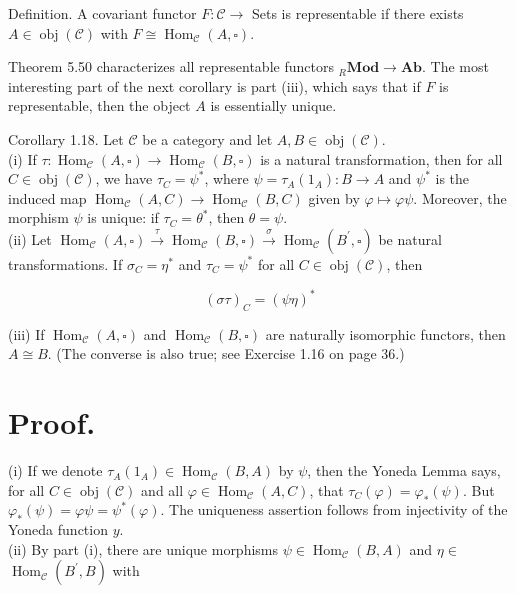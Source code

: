 \documentclass[10pt, letterpaper]{article}
\begin{document}
Definition. A covariant functor $F: \mathcal{C} \rightarrow$ Sets is representable if there exists $A \in \operatorname{obj}(\mathcal{C})$ with $F \cong \operatorname{Hom}_{\mathcal{C}}(A, \square)$.

Theorem 5.50 characterizes all representable functors ${ }_{R} \mathbf{M o d} \rightarrow \mathbf{A b}$. The most interesting part of the next corollary is part (iii), which says that if $F$ is representable, then the object $A$ is essentially unique.

Corollary 1.18. Let $\mathcal{C}$ be a category and let $A, B \in \operatorname{obj}(\mathcal{C})$.\\
(i) If $\tau: \operatorname{Hom}_{\mathcal{C}}(A, \square) \rightarrow \operatorname{Hom}_{\mathcal{C}}(B, \square)$ is a natural transformation, then for all $C \in \operatorname{obj}(\mathcal{C})$, we have $\tau_{C}=\psi^{*}$, where $\psi=\tau_{A}\left(1_{A}\right): B \rightarrow A$ and $\psi^{*}$ is the induced map $\operatorname{Hom}_{\mathcal{C}}(A, C) \rightarrow \operatorname{Hom}_{\mathcal{C}}(B, C)$ given by $\varphi \mapsto \varphi \psi$. Moreover, the morphism $\psi$ is unique: if $\tau_{C}=\theta^{*}$, then $\theta=\psi$.\\
(ii) Let $\operatorname{Hom}_{\mathcal{C}}(A, \square) \xrightarrow{\tau} \operatorname{Hom}_{\mathcal{C}}(B, \square) \xrightarrow{\sigma} \operatorname{Hom}_{\mathcal{C}}\left(B^{\prime}, \square\right)$ be natural transformations. If $\sigma_{C}=\eta^{*}$ and $\tau_{C}=\psi^{*}$ for all $C \in \operatorname{obj}(\mathcal{C})$, then

$$
(\sigma \tau)_{C}=(\psi \eta)^{*}
$$

(iii) If $\operatorname{Hom}_{\mathcal{C}}(A, \square)$ and $\operatorname{Hom}_{\mathcal{C}}(B, \square)$ are naturally isomorphic functors, then $A \cong B$. (The converse is also true; see Exercise 1.16 on page 36.)

\section*{Proof.}
(i) If we denote $\tau_{A}\left(1_{A}\right) \in \operatorname{Hom}_{\mathcal{C}}(B, A)$ by $\psi$, then the Yoneda Lemma says, for all $C \in \operatorname{obj}(\mathcal{C})$ and all $\varphi \in \operatorname{Hom}_{\mathcal{C}}(A, C)$, that $\tau_{C}(\varphi)=\varphi_{*}(\psi)$. But $\varphi_{*}(\psi)=\varphi \psi=\psi^{*}(\varphi)$. The uniqueness assertion follows from injectivity of the Yoneda function $y$.\\
(ii) By part (i), there are unique morphisms $\psi \in \operatorname{Hom}_{\mathcal{C}}(B, A)$ and $\eta \in$ $\operatorname{Hom}_{\mathcal{C}}\left(B^{\prime}, B\right)$ with
\end{document}
